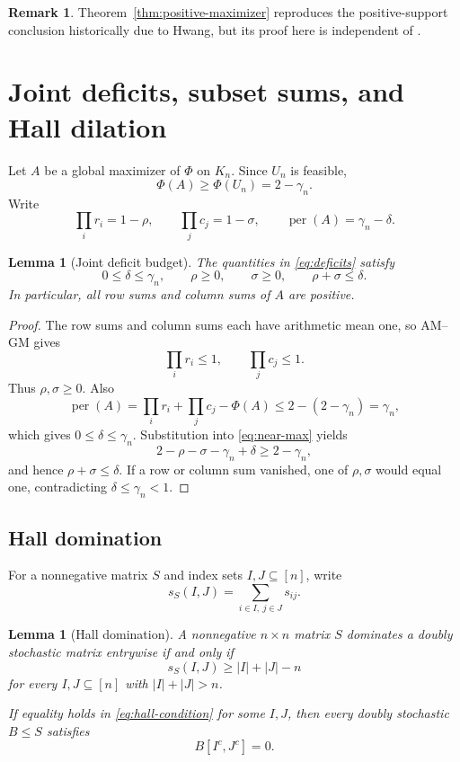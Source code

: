 \documentclass[11pt]{article}
\newtheorem{lemma}[theorem]{Lemma}
\theoremstyle{definition}
\newtheorem{remark}[theorem]{Remark}
\newcommand{\per}{\operatorname{per}}
\newcommand{\1}{\mathbf{1}}
\begin{document}
\begin{remark}
Theorem~\ref{thm:positive-maximizer} reproduces the positive-support conclusion historically due to Hwang, but its proof here is independent of \cite{Hwang1986}.
\end{remark}

\section{Joint deficits, subset sums, and Hall dilation}\label{sec:hall}

Let $A$ be a global maximizer of $\Phi$ on $K_n$.  Since $U_n$ is feasible,
\[
 \Phi(A)\ge \Phi(U_n)=2-\gamma_n.
 \tag{5.1}\label{eq:near-max}
\]
Write
\[
 \prod_i r_i=1-\rho,
 \qquad
 \prod_jc_j=1-\sigma,
 \qquad
 \per(A)=\gamma_n-\delta.
 \tag{5.2}\label{eq:deficits}
\]

\begin{lemma}[Joint deficit budget]\label{lem:joint-deficit}
The quantities in \eqref{eq:deficits} satisfy
\[
 0\le\delta\le\gamma_n,
 \qquad
 \rho\ge0,
 \qquad
 \sigma\ge0,
 \qquad
 \rho+\sigma\le\delta.
 \tag{5.3}\label{eq:joint-budget}
\]
In particular, all row sums and column sums of $A$ are positive.
\end{lemma}

\begin{proof}
The row sums and column sums each have arithmetic mean one, so AM--GM gives
\[
 \prod_i r_i\le1,
 \qquad
 \prod_jc_j\le1.
\]
Thus $\rho,\sigma\ge0$.  Also
\[
 \per(A)
 =\prod_i r_i+\prod_jc_j-\Phi(A)
 \le2-(2-\gamma_n)=\gamma_n,
\]
which gives $0\le\delta\le\gamma_n$.  Substitution into \eqref{eq:near-max} yields
\[
 2-\rho-\sigma-\gamma_n+\delta\ge2-\gamma_n,
\]
and hence $\rho+\sigma\le\delta$.  If a row or column sum vanished, one of $\rho,\sigma$ would equal one, contradicting $\delta\le\gamma_n<1$.
\end{proof}

\subsection{Hall domination}

For a nonnegative matrix $S$ and index sets $I,J\subseteq[n]$, write
\[
 s_S(I,J)=\sum_{i\in I,\ j\in J}s_{ij}.
\]

\begin{lemma}[Hall domination]\label{lem:hall}
A nonnegative $n\times n$ matrix $S$ dominates a doubly stochastic matrix entrywise if and only if
\[
 s_S(I,J)\ge |I|+|J|-n
 \tag{5.4}\label{eq:hall-condition}
\]
for every $I,J\subseteq[n]$ with $|I|+|J|>n$.

If equality holds in \eqref{eq:hall-condition} for some $I,J$, then every doubly stochastic $B\le S$ satisfies
\[
 B[I^c,J^c]=0.
 \tag{5.5}\label{eq:forced-block}
\]
\end{lemma}
\end{document}
